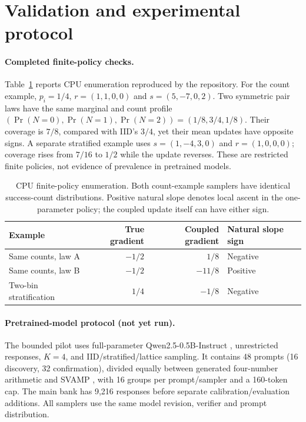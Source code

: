 \section{Validation and experimental protocol}
\paragraph{Completed finite-policy checks.}
Table~\ref{tab:exact} reports CPU enumeration reproduced by the repository.
For the count example, $p_i=1/4$, $r=(1,1,0,0)$ and $s=(5,-7,0,2)$.
Two symmetric pair laws have the same marginal and count profile
$(\Pr(N=0),\Pr(N=1),\Pr(N=2))=(1/8,3/4,1/8)$.
Their coverage is $7/8$, compared with IID's $3/4$, yet their mean updates have
opposite signs. A separate stratified example uses $s=(1,-4,3,0)$ and $r=(1,0,0,0)$;
coverage rises from $7/16$ to $1/2$ while the update reverses.
These are restricted finite policies, not evidence of prevalence in pretrained models.

\begin{table}[t]
\centering
\caption{CPU finite-policy enumeration. Both count-example samplers have identical
success-count distributions. Positive natural slope denotes local ascent in the
one-parameter policy; the coupled update itself can have either sign.}
\label{tab:exact}
\begin{tabular}{lrrl}
\toprule
Example & True gradient & Coupled gradient & Natural slope sign\\
\midrule
Same counts, law A & $-1/2$ & $1/8$ & Negative\\
Same counts, law B & $-1/2$ & $-11/8$ & Positive\\
Two-bin stratification & $1/4$ & $-1/8$ & Negative\\
\bottomrule
\end{tabular}
\end{table}

\paragraph{Pretrained-model protocol (not yet run).}
The bounded pilot uses full-parameter Qwen2.5-0.5B-Instruct \citep{qwen2025half},
unrestricted responses, $K=4$, and IID/stratified/lattice sampling. It contains
48 prompts (16 discovery, 32 confirmation), divided equally between generated
four-number arithmetic and SVAMP \citep{patel2021svamp}, with 16 groups per
prompt/sampler and a 160-token cap. The main bank has 9,216 responses before
separate calibration/evaluation additions.
All samplers use the same model revision, verifier and prompt distribution.

